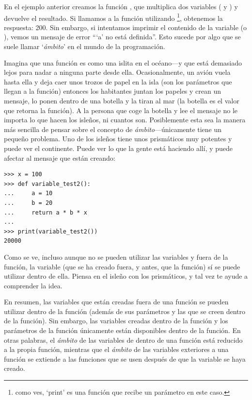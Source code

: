 En el ejemplo anterior creamos la función , que multiplica dos variables ( y ) y devuelve el resultado.  Si llamamos a la función utilizando \footnote{como ves, `print' es una función que recibe un parámetro en este caso.}, obtenemos la respuesta: 200.  Sin embargo, si intentamos imprimir el contenido de la variable  (o ), vemos un mensaje de error ```a' no está definida''. Esto sucede por algo que se suele llamar `\emph{ámbito}' en el mundo de la programación.
\par
Imagina que una función es como una islita en el océano---y que está demasiado lejos para nadar a ninguna parte desde ella.  Ocasionalmente, un avión vuela hasta ella y deja caer unos trozos de papel en la isla (son los parámetros que llegan a la función)  entonces los habitantes juntan los papeles y crean un mensaje, lo ponen dentro de una botella y la tiran al mar (la botella es el valor que retorna la función).  A la persona que coge la botella y lee el mensaje no le importa lo que hacen los isleños, ni cuantos son.   Posiblemente esta sea la manera más sencilla de pensar sobre el concepto de \emph{ámbito}---únicamente tiene un pequeño problema.  Uno de los isleños tiene unos prismáticos muy potentes y puede ver el continente.  Puede ver lo que la gente está haciendo allí, y puede afectar al mensaje que están creando:

\begin{listing}
\begin{verbatim}
>>> x = 100
>>> def variable_test2():
...     a = 10
...     b = 20
...     return a * b * x
... 
>>> print(variable_test2())
20000
\end{verbatim}
\end{listing}

Como se ve, incluso aunque no se pueden utilizar las variables  y  fuera de la función, la variable  (que se ha creado fuera, y antes, que la función) sí se puede utilizar dentro de ella.  Piensa en el isleño con los prismáticos, y tal vez te ayude a comprender la idea.

En resumen, las variables que están creadas fuera de una función se pueden utilizar dentro de la función (además de sus parámetros y las que se creen dentro de la función). Sin embargo, las variables creadas dentro de la función y los parámetros de la función únicamente están disponibles dentro de la función. En otras palabras, el \emph{ámbito} de las variables de dentro de una función está reducido a la propia función, mientras que el \emph{ámbito} de las variables exteriores a una función se extiende a las funciones que se usen después de que la variable se haya creado.

